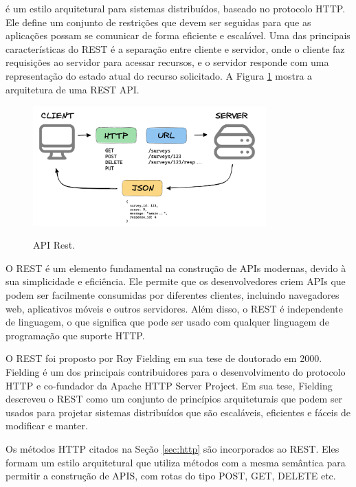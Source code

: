  é um estilo arquitetural para sistemas distribuídos, baseado no protocolo HTTP. Ele define um conjunto de restrições que devem ser seguidas para que as aplicações possam se comunicar de forma eficiente e escalável. Uma das principais características do REST é a separação entre cliente e servidor, onde o cliente faz requisições ao servidor para acessar recursos, e o servidor responde com uma representação do estado atual do recurso solicitado. A Figura \ref{fig:rest} mostra a arquitetura de uma REST API.

\begin{figure}[h]
\centering
\caption{API Rest.}
\includegraphics[width=0.8\textwidth]{figuras/rest-api.png}
\label{fig:rest}
\end{figure}

O \gls{REST} é um elemento fundamental na construção de APIs modernas, devido à sua simplicidade e eficiência. Ele permite que os desenvolvedores criem APIs que podem ser facilmente consumidas por diferentes clientes, incluindo navegadores web, aplicativos móveis e outros servidores. Além disso, o \gls{REST} é independente de linguagem, o que significa que pode ser usado com qualquer linguagem de programação que suporte \gls{HTTP}.

O \gls{REST} foi proposto por Roy Fielding em sua tese de doutorado em 2000. Fielding é um dos principais contribuidores para o desenvolvimento do protocolo HTTP e co-fundador da Apache \gls{HTTP} Server Project. Em sua tese, Fielding descreveu o REST como um conjunto de princípios arquiteturais que podem ser usados para projetar sistemas distribuídos que são escaláveis, eficientes e fáceis de modificar e manter.

Os métodos HTTP citados na Seção \ref{sec:http} são incorporados ao REST. Eles formam um estilo arquitetural que utiliza métodos com a mesma semântica para permitir a construção de APIS, com rotas do tipo POST, GET, DELETE etc.

